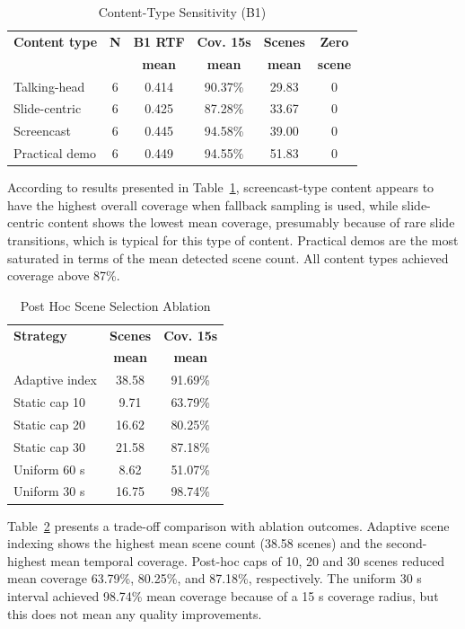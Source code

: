 ﻿\documentclass[conference]{IEEEtran}
\begin{document}
\begin{table}[t]
\caption{Content-Type Sensitivity (B1)}
\label{tab:content_sensitivity}
\centering
\footnotesize
\setlength{\tabcolsep}{4.2pt}
\begin{tabular}{lccccc}
\toprule
\textbf{Content type} & \textbf{N} & \textbf{B1 RTF} & \textbf{Cov. 15s} & \textbf{Scenes} & \textbf{Zero} \\
 &  & \textbf{mean} & \textbf{mean} & \textbf{mean} & \textbf{scene} \\
\midrule
Talking-head & 6 & 0.414 & 90.37\% & 29.83 & 0 \\
Slide-centric & 6 & 0.425 & 87.28\% & 33.67 & 0 \\
Screencast & 6 & 0.445 & 94.58\% & 39.00 & 0 \\
Practical demo & 6 & 0.449 & 94.55\% & 51.83 & 0 \\
\bottomrule
\end{tabular}
\end{table}

According to results presented in Table~\ref{tab:content_sensitivity}, screencast-type content appears to have the highest overall coverage when fallback sampling is used, while slide-centric content shows the lowest mean coverage, presumably because of rare slide transitions, which is typical for this type of content. Practical demos are the most saturated in terms of the mean detected scene count. All content types achieved coverage above 87\%.

\begin{table}[t]
\caption{Post Hoc Scene Selection Ablation}
\label{tab:scene_ablation}
\centering
\footnotesize
\setlength{\tabcolsep}{5pt}
\begin{tabular}{lcc}
\toprule
\textbf{Strategy} & \textbf{Scenes} & \textbf{Cov. 15s} \\
 & \textbf{mean} & \textbf{mean} \\
\midrule
Adaptive index & 38.58 & 91.69\% \\
Static cap 10 & 9.71 & 63.79\% \\
Static cap 20 & 16.62 & 80.25\% \\
Static cap 30 & 21.58 & 87.18\% \\
Uniform 60 s & 8.62 & 51.07\% \\
Uniform 30 s & 16.75 & 98.74\% \\
\bottomrule
\end{tabular}
\end{table}

Table~\ref{tab:scene_ablation} presents a trade-off comparison with ablation outcomes. Adaptive scene indexing shows the highest mean scene count (38.58 scenes) and the second-highest mean temporal coverage. Post-hoc caps of 10, 20 and 30 scenes reduced mean coverage 63.79\%, 80.25\%, and 87.18\%, respectively. The uniform 30 s interval achieved 98.74\% mean coverage because of a 15 s coverage radius, but this does not mean any quality improvements.
\end{document}
